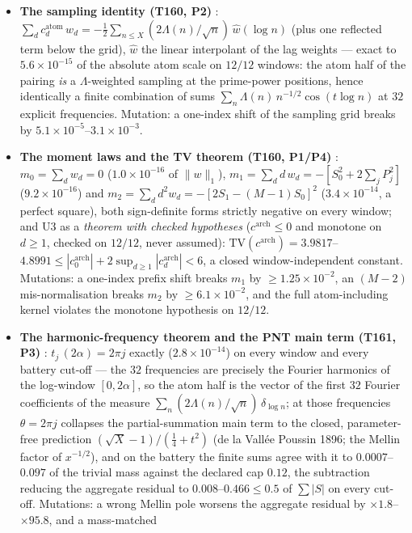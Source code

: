 \documentclass[11pt,a4paper]{article}
\begin{document}
\begin{itemize}[leftmargin=1.5em]
\item \textbf{The sampling identity (T160, P2)} \mE:
$\sum_d c^{\mathrm{atom}}_d\,w_d=-\tfrac12\sum_{n\le X}(2\Lambda(n)/\sqrt n)\,
\widehat w(\log n)$ (plus one reflected term below the grid), $\widehat w$ the linear
interpolant of the lag weights --- exact to $5.6\times10^{-15}$ of the absolute atom scale
on $12/12$ windows: the atom half of the pairing \emph{is} a $\Lambda$-weighted sampling at
the prime-power positions, hence identically a finite combination of sums
$\sum_n\Lambda(n)\,n^{-1/2}\cos(t\log n)$ at $32$ explicit frequencies. Mutation: a
one-index shift of the sampling grid breaks by $5.1\times10^{-5}$--$3.1\times10^{-3}$.
\item \textbf{The moment laws and the TV theorem (T160, P1/P4)} \mE: $m_0=\sum_d w_d=0$
($1.0\times10^{-16}$ of $\|w\|_1$), $m_1=\sum_d d\,w_d=-[S_0^2+2\sum_jP_j^2]$
($9.2\times10^{-16}$) and $m_2=\sum_d d^2w_d=-[2S_1-(M{-}1)S_0]^2$ ($3.4\times10^{-14}$, a
perfect square), both sign-definite forms strictly negative on every window; and U3 as a
\emph{theorem with checked hypotheses} ($c^{\mathrm{arch}}\le0$ and monotone on $d\ge1$,
checked on $12/12$, never assumed): $\mathrm{TV}(c^{\mathrm{arch}})=3.9817$--$4.8991\le
|c^{\mathrm{arch}}_0|+2\sup_{d\ge1}|c^{\mathrm{arch}}_d|<6$, a closed window-independent
constant. Mutations: a one-index prefix shift breaks $m_1$ by $\ge1.25\times10^{-2}$, an
$(M{-}2)$ mis-normalisation breaks $m_2$ by $\ge6.1\times10^{-2}$, and the full
atom-including kernel violates the monotone hypothesis on $12/12$.
\item \textbf{The harmonic-frequency theorem and the PNT main term (T161, P3)} \mE:
$t_j\,(2\alpha)=2\pi j$ exactly ($2.8\times10^{-14}$) on every window and every battery
cut-off --- the $32$ frequencies are precisely the Fourier harmonics of the log-window
$[0,2\alpha]$, so the atom half is the vector of the first $32$ Fourier coefficients of the
measure $\sum_n(2\Lambda(n)/\sqrt n)\,\delta_{\log n}$; at those frequencies
$\theta=2\pi j$ collapses the partial-summation main term to the closed, parameter-free
prediction $(\sqrt X-1)/(\tfrac14+t^2)$ (de la Vall\'ee Poussin 1896; the Mellin factor of
$x^{-1/2}$), and on the battery the finite sums agree with it to $0.0007$--$0.097$ of the
trivial mass against the declared cap $0.12$, the subtraction reducing the aggregate
residual to $0.008$--$0.466\le0.5$ of $\sum|S|$ on every cut-off. Mutations: a wrong Mellin
pole worsens the aggregate residual by $\times1.8$--$\times95.8$, and a mass-matched

\end{itemize}
\end{document}
